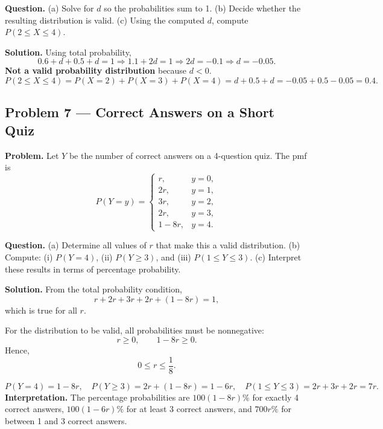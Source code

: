 \begin{ExamProblems}
		\textbf{Question.}
		(a) Solve for $d$ so the probabilities sum to 1.
		(b) Decide whether the resulting distribution is valid.
		(c) Using the computed $d$, compute $P(2\le X\le 4)$.
		
		\textbf{Solution.}
		Using total probability,
		\[
		0.6+d+0.5+d=1\Rightarrow 1.1+2d=1\Rightarrow 2d=-0.1\Rightarrow d=-0.05.
		\]
		\textbf{Not a valid probability distribution} because $d<0$.
		\[
		P(2\le X\le 4)=P(X=2)+P(X=3)+P(X=4)=d+0.5+d=-0.05+0.5-0.05=0.4.
		\]
		

		\item
		\subsection*{Problem 7 — Correct Answers on a Short Quiz}
		
		\textbf{Problem.}
		Let $Y$ be the number of correct answers on a 4-question quiz. The pmf is
		\[
		P(Y=y)=\begin{cases}
			r, & y=0,\\
			2r, & y=1,\\
			3r, & y=2,\\
			2r, & y=3,\\
			1-8r, & y=4.
		\end{cases}
		\]
		
		\textbf{Question.}
		(a) Determine all values of $r$ that make this a valid distribution.
		(b) Compute: (i) $P(Y=4)$, (ii) $P(Y\ge 3)$, and (iii) $P(1\le Y\le 3)$.
		(c) Interpret these results in terms of percentage probability.
		
		\textbf{Solution.}
		From the total probability condition,
		\[
		r+2r+3r+2r+(1-8r)=1,
		\]
		which is true for all $r$.
		
		For the distribution to be valid, all probabilities must be nonnegative:
		\[
		r\ge 0,\qquad 1-8r\ge 0.
		\]
		Hence,
		\[
		0\le r\le \frac{1}{8}.
		\]
		
		\[
		P(Y=4)=1-8r,\quad
		P(Y\ge 3)=2r+(1-8r)=1-6r,\quad
		P(1\le Y\le 3)=2r+3r+2r=7r.
		\]
		\textbf{Interpretation.} The percentage probabilities are $100(1-8r)\%$ for exactly 4 correct answers, $100(1-6r)\%$ for at least 3 correct answers, and $700r\%$ for between 1 and 3 correct answers.
		
		
		
		
		\item

\end{ExamProblems}
